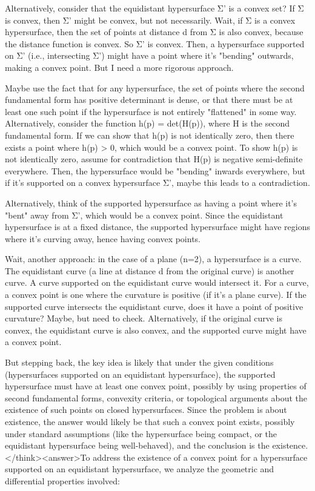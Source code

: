 Alternatively, consider that the equidistant hypersurface Σ' is a convex set? If Σ is convex, then Σ' might be convex, but not necessarily. Wait, if Σ is a convex hypersurface, then the set of points at distance d from Σ is also convex, because the distance function is convex. So Σ' is convex. Then, a hypersurface supported on Σ' (i.e., intersecting Σ') might have a point where it's "bending" outwards, making a convex point. But I need a more rigorous approach.

Maybe use the fact that for any hypersurface, the set of points where the second fundamental form has positive determinant is dense, or that there must be at least one such point if the hypersurface is not entirely "flattened" in some way. Alternatively, consider the function h(p) = det(H(p)), where H is the second fundamental form. If we can show that h(p) is not identically zero, then there exists a point where h(p) > 0, which would be a convex point. To show h(p) is not identically zero, assume for contradiction that H(p) is negative semi-definite everywhere. Then, the hypersurface would be "bending" inwards everywhere, but if it's supported on a convex hypersurface Σ', maybe this leads to a contradiction.

Alternatively, think of the supported hypersurface as having a point where it's "bent" away from Σ', which would be a convex point. Since the equidistant hypersurface is at a fixed distance, the supported hypersurface might have regions where it's curving away, hence having convex points.

Wait, another approach: in the case of a plane (n=2), a hypersurface is a curve. The equidistant curve (a line at distance d from the original curve) is another curve. A curve supported on the equidistant curve would intersect it. For a curve, a convex point is one where the curvature is positive (if it's a plane curve). If the supported curve intersects the equidistant curve, does it have a point of positive curvature? Maybe, but need to check. Alternatively, if the original curve is convex, the equidistant curve is also convex, and the supported curve might have a convex point.

But stepping back, the key idea is likely that under the given conditions (hypersurfaces supported on an equidistant hypersurface), the supported hypersurface must have at least one convex point, possibly by using properties of second fundamental forms, convexity criteria, or topological arguments about the existence of such points on closed hypersurfaces. Since the problem is about existence, the answer would likely be that such a convex point exists, possibly under standard assumptions (like the hypersurface being compact, or the equidistant hypersurface being well-behaved), and the conclusion is the existence.</think><answer>To address the existence of a convex point for a hypersurface supported on an equidistant hypersurface, we analyze the geometric and differential properties involved:  

